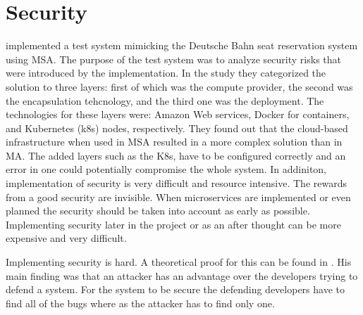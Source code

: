 

\section{Security}
\begin{sloppypar}
    \citet{closer18} implemented a test system mimicking the Deutsche Bahn 
    seat reservation system using MSA. The purpose of the test system was to
    analyze security risks that were introduced by the implementation. In the 
    study they categorized the solution to three layers: first of which was the 
    compute provider, the second was the encapsulation tehcnology, and the 
    third one was the deployment. The technologies for these layers were: 
    Amazon Web services, Docker for containers, and Kubernetes (k8s) nodes, 
    respectively. They found out that the cloud-based infrastructure when used 
    in MSA resulted in a more complex solution than in MA. The added layers 
    such as the K8s, have to be configured correctly and an error in one could 
    potentially compromise the whole system. In addiniton, implementation of 
    security is very difficult and resource intensive. The rewards from a good 
    security are invisible. When microservices are implemented or even planned 
    the security should be taken into account as early as possible. 
    Implementing security later in the project or as an after thought can be 
    more expensive and very difficult.
\end{sloppypar}
\begin{sloppypar}
    Implementing security is hard. A theoretical proof for this can be found in 
    \citet{andersson2001information}. His main finding was that an attacker has 
    an advantage over the developers trying to defend a system. For the system 
    to be secure the defending developers have to find all of the bugs where as 
    the attacker has to find only one.
\end{sloppypar}




